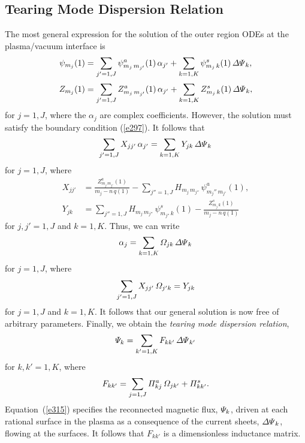 \documentclass[12pt,prb,aps]{revtex4-1}
\begin{document}
\subsection{Tearing Mode Dispersion Relation}
The most general expression for the solution of the outer region ODEs at the plasma/vacuum interface is
\begin{align}
\psi_{m_j}(1) &= \sum_{j'=1,J}\psi_{m_j\,m_{j'}}^a(1)\,\alpha_{j'} + \sum_{k=1,K}\psi_{m_j\,k}^s(1)\,{\mit\Delta\Psi}_k,\\[0.5ex]
Z_{m_j}(1) &= \sum_{j'=1,J}Z_{m_j\,m_{j'}}^a(1)\,\alpha_{j'} + \sum_{k=1,K}Z_{m_j\,k}^s(1)\,{\mit\Delta\Psi}_k,
\end{align}
for $j=1,J$, where the $\alpha_j$ are complex coefficients. However, the solution must satisfy the boundary condition (\ref{e297}). 
It follows that
\begin{equation}
\sum_{j'=1,J}X_{jj'}\,\alpha_{j'} = \sum_{k=1,K}Y_{jk}\,{\mit\Delta\Psi}_k
\end{equation}
for $j=1,J$, where
\begin{align}
X_{jj'} &=\frac{Z^a_{m_j\,m_{j'}}(1)}{m_j-n\,q(1)}-\sum_{j''=1,J} H_{m_j\,m_{j''}}\,\psi^a_{m_j''\,m_{j'}}(1),\\[0.5ex]
Y_{jk} &= \sum_{j''=1,J}H_{m_j\,m_{j''}}\,\psi_{m_{j''}\,k}^s(1)-\frac{Z^s_{m_j\,k}(1)}{m_j-n\,q(1)}
\end{align}
for $j,j'=1,J$ and $k=1,K$. Thus, we can write
\begin{equation}
\alpha_j = \sum_{k=1,K}{\mit\Omega}_{jk}\,{\mit\Delta\Psi}_k
\end{equation}
for $j=1,J$, 
where
\begin{equation}
\sum_{j'=1,J}X_{jj'}\,{\mit\Omega}_{j'k} = Y_{jk}
\end{equation}
for $j=1,J$ and $k=1,K$. It follows that our general solution is now free of arbitrary parameters.
 Finally, we obtain the {\em tearing mode dispersion relation},\cite{connor,cht,am1,pletz}
\begin{equation}\label{e315}
{\mit\Psi}_k = \sum_{k'=1,K}F_{kk'}\,{\mit\Delta\Psi}_{k'}
\end{equation}
for $k,k'=1,K$, where
\begin{equation}
F_{kk'}=\sum_{j=1,J}{\mit\Pi}^a_{kj}\,{\mit\Omega}_{jk'} + {\mit\Pi}^s_{kk'}.
\end{equation}
Equation~(\ref{e315}) specifies the reconnected magnetic flux, ${\mit\Psi}_k$, driven at each rational surface in the plasma
as a consequence of the current sheets, ${\mit\Delta\Psi}_k$, flowing at the surfaces. It follows that $F_{kk'}$ is a dimensionless
inductance matrix.\cite{rfbook}
\end{document}
